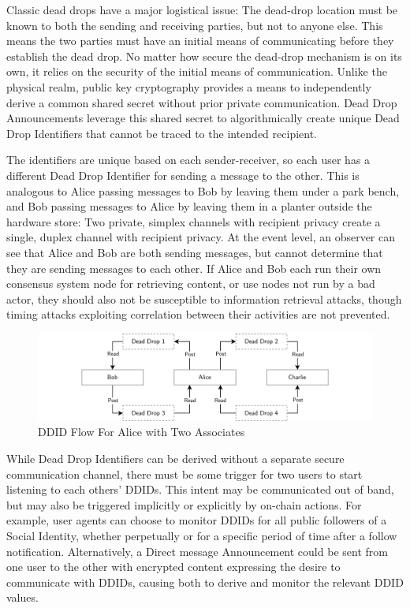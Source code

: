 \documentclass[12pt,letterpaper]{article}
\begin{document}
Classic dead drops have a major logistical issue: The dead-drop location must be known to
both the sending and receiving parties, but not to anyone else. This means the two parties
must have an initial means of communicating before they establish the dead drop. No matter
how secure the dead-drop mechanism is on its own, it relies on the security of the initial
means of communication. Unlike the physical realm, public key cryptography provides a
means to independently derive a common shared secret without prior private
communication.\cite{diffie-hellman1976} Dead Drop Announcements leverage this shared
secret to algorithmically create unique Dead Drop Identifiers that cannot be traced to the
intended recipient.

The identifiers are unique based on each sender-receiver, so each user has a different Dead
Drop Identifier for sending a message to the other. This is analogous to Alice passing
messages to Bob by leaving them under a park bench, and Bob passing messages to Alice by
leaving them in a planter outside the hardware store: Two private, simplex channels with
recipient privacy create a single, duplex channel with recipient privacy. At the event
level, an observer can see that Alice and Bob are both sending messages, but cannot
determine that they are sending messages to each other. If Alice and Bob each run their own
consensus system node for retrieving content, or use nodes not run by a bad actor, they
should also not be susceptible to information retrieval attacks, though timing attacks
exploiting correlation between their activities are not prevented.

\begin{figure}
	\includegraphics[width=\linewidth]{figures/DDID Flow For Alice with Two Associates.png}
	\caption{DDID Flow For Alice with Two Associates}
	\label{fig:7}
\end{figure}

While Dead Drop Identifiers can be derived without a separate secure communication channel,
there must be some trigger for two users to start listening to each others' DDIDs. This
intent may be communicated out of band, but may also be triggered implicitly or explicitly
by on-chain actions. For example, user agents can choose to monitor DDIDs for all public
followers of a Social Identity, whether perpetually or for a specific period of time after a
follow notification. Alternatively, a Direct message Announcement could be sent from one
user to the other with encrypted content expressing the desire to communicate with DDIDs,
causing both to derive and monitor the relevant DDID values.
\end{document}
